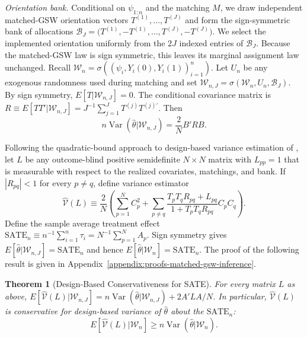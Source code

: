 \documentclass[letterpaper,12pt]{article}
\newtheorem{thm}{Theorem}[section]
\theoremstyle{definition}
\numberwithin{equation}{section}
\newcommand{\mc}{\mathcal}
\newcommand{\SATE}{\mathrm{SATE}}
\newcommand{\E}{E}
\DeclareMathOperator{\var}{Var}
\begin{document}
\emph{Orientation bank.}
Conditional on $\psi_{1:n}$ and the matching $M$, we draw independent matched-GSW orientation vectors $T^{(1)},\ldots,T^{(J)}$ and form the sign-symmetric bank of allocations $\mc B_J=\bigl(T^{(1)},-T^{(1)},\ldots,T^{(J)},-T^{(J)}\bigr)$.
We select the implemented orientation uniformly from the $2J$ indexed entries of $\mc B_J$.
Because the matched-GSW law is sign symmetric, this leaves its marginal assignment law unchanged.
Recall $\mathcal W_n=\sigma((\psi_i,Y_i(0),Y_i(1))_{i=1}^n)$.
Let $U_n$ be any exogenous randomness used during matching and set $\mathcal W_{n,J}=\sigma(\mathcal W_n,U_n,\mc B_J)$.
By sign symmetry, $\E[T|\mathcal W_{n,J}]=0$.
The conditional covariance matrix is $R\equiv\E[TT'|\mathcal W_{n,J}]=J^{-1}\sum_{j=1}^JT^{(j)}T^{(j)'}$.
Then
\begin{equation}\label{equation:matched-inference-bank}
n\var(\widehat\theta|\mathcal W_{n,J})=\frac2NB'RB.
\end{equation}

Following the quadratic-bound approach to design-based variance estimation of \citet{harshaw2026optimized}, let $L$ be any outcome-blind positive semidefinite $N\times N$ matrix with $L_{pp}=1$ that is measurable with respect to the realized covariates, matchings, and bank.
If $|R_{pq}|<1$ for every $p\neq q$, define variance estimator
\begin{equation}\label{equation:matched-inference-completion}
\widehat{\mc V}(L)\equiv\frac2N\left(\sum_{p=1}^NC_p^2+\sum_{p\neq q}\frac{T_pT_qR_{pq}+L_{pq}}{1+T_pT_qR_{pq}}C_pC_q\right).
\end{equation}
Define the sample average treatment effect $\SATE_n\equiv n^{-1}\sum_{i=1}^n\tau_i=N^{-1}\sum_{p=1}^NA_p$.
Sign symmetry gives $\E[\widehat\theta|\mathcal W_{n,J}]=\SATE_n$ and hence $\E[\widehat\theta|\mathcal W_n]=\SATE_n$.
The proof of the following result is given in Appendix~\ref{appendix:proofs-matched-gsw-inference}.

\begin{thm}[Design-Based Conservativeness for SATE]\label{theorem:matched-gsw-inference}
For every matrix $L$ as above, $\E[\widehat{\mc V}(L)|\mathcal W_{n,J}]=n\var(\widehat\theta|\mathcal W_{n,J})+2A'LA/N$.
In particular, $\widehat{\mc V}(L)$ is conservative for design-based variance of $\widehat\theta$ about the $\SATE_n$:
\begin{equation}\label{equation:matched-inference-expectation}
\E[\widehat{\mc V}(L)|\mathcal W_n]\geq n\var(\widehat\theta|\mathcal W_n).
\end{equation}
\end{thm}
\end{document}
